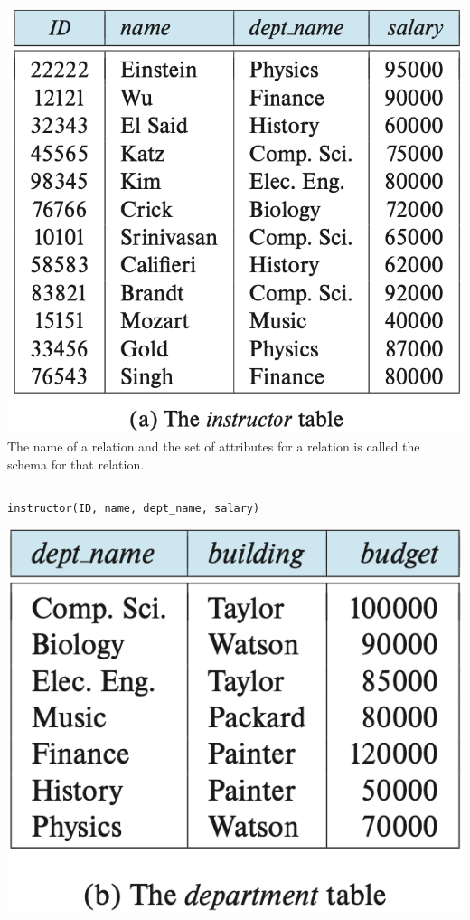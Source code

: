 \documentclass[aspectratio=169, 14pt]{beamer}
\begin{document}
\begin{frame}
	\begin{columns}
		\includegraphics[height=.7\paperheight]{table/instructor}
		The name of a relation and the set of attributes for a relation is called the \alert{schema} for that relation.
	\end{columns}
	\texttt{instructor(ID, name, dept\_name, salary)}
\end{frame}
\begin{frame}

	\begin{center}
		\includegraphics[height=.7\paperheight]{table/department}
	\end{center}
\end{frame}
\end{document}
